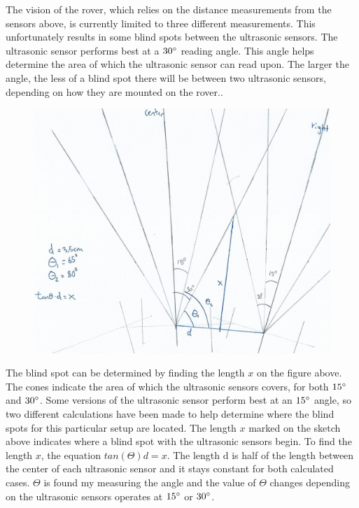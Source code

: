 
The vision of the rover, which relies on the distance measurements from the sensors above, is currently limited to three different measurements. This unfortunately results in some blind spots between the ultrasonic sensors.
The ultrasonic sensor performs best at a $30\degree$ reading angle. This angle helps determine the area of which the ultrasonic sensor can read upon. The larger the angle, the less of a blind spot there will be between two ultrasonic sensors, depending on how they are mounted on the rover.\cite{hcsr40datesheet}.

\clearpage
\begin{figure}[H]
	\centering
	\includegraphics[width=1\linewidth]{images/blindspot_calc.jpg}
\end{figure}

The blind spot can be determined by finding the length $x$ on the figure above. The cones indicate the area of which the ultrasonic sensors covers, for both $15\degree$ and $30\degree$. Some versions of the ultrasonic sensor perform best at an $15\degree$ angle, so two different calculations have been made to help determine where the blind spots for this particular setup are located.
The length $x$ marked on the sketch above indicates where a blind spot with the ultrasonic sensors begin. To find the length $x$, the equation $tan(\Theta)d = x$. The length d is half of the length between the center of each ultrasonic sensor and it stays constant for both calculated cases. $\Theta$ is found my measuring the angle and the value of $\Theta$ changes depending on the ultrasonic sensors operates at $15\degree$ or $30\degree$.

